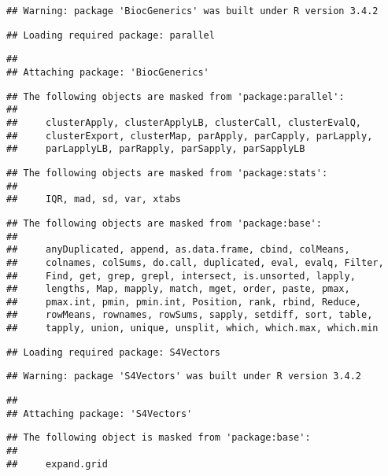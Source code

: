 \documentclass[]{article}
\begin{document}
\begin{verbatim}
## Warning: package 'BiocGenerics' was built under R version 3.4.2
\end{verbatim}

\begin{verbatim}
## Loading required package: parallel
\end{verbatim}

\begin{verbatim}
## 
## Attaching package: 'BiocGenerics'
\end{verbatim}

\begin{verbatim}
## The following objects are masked from 'package:parallel':
## 
##     clusterApply, clusterApplyLB, clusterCall, clusterEvalQ,
##     clusterExport, clusterMap, parApply, parCapply, parLapply,
##     parLapplyLB, parRapply, parSapply, parSapplyLB
\end{verbatim}

\begin{verbatim}
## The following objects are masked from 'package:stats':
## 
##     IQR, mad, sd, var, xtabs
\end{verbatim}

\begin{verbatim}
## The following objects are masked from 'package:base':
## 
##     anyDuplicated, append, as.data.frame, cbind, colMeans,
##     colnames, colSums, do.call, duplicated, eval, evalq, Filter,
##     Find, get, grep, grepl, intersect, is.unsorted, lapply,
##     lengths, Map, mapply, match, mget, order, paste, pmax,
##     pmax.int, pmin, pmin.int, Position, rank, rbind, Reduce,
##     rowMeans, rownames, rowSums, sapply, setdiff, sort, table,
##     tapply, union, unique, unsplit, which, which.max, which.min
\end{verbatim}

\begin{verbatim}
## Loading required package: S4Vectors
\end{verbatim}

\begin{verbatim}
## Warning: package 'S4Vectors' was built under R version 3.4.2
\end{verbatim}

\begin{verbatim}
## 
## Attaching package: 'S4Vectors'
\end{verbatim}

\begin{verbatim}
## The following object is masked from 'package:base':
## 
##     expand.grid
\end{verbatim}
\end{document}
